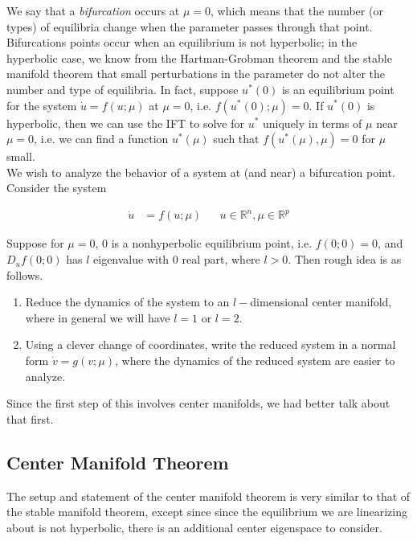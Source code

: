 \documentclass{article}
\def\R{{\mathbb R}}
\begin{document}
We say that a \emph{bifurcation} occurs at $\mu = 0$, which means that the number (or types) of equilibria change when the parameter passes through that point. Bifurcations points occur when an equilibrium is not hyperbolic; in the hyperbolic case, we know from the Hartman-Grobman theorem and the stable manifold theorem that small perturbations in the parameter do not alter the number and type of equilibria. In fact, suppose $u^*(0)$ is an equilibrium point for the system $\dot{u} = f(u; \mu)$ at $\mu = 0$, i.e. $f(u^*(0); \mu)= 0$. If $u^*(0)$ is hyperbolic, then we can use the IFT to solve for $u^*$ uniquely in terms of $\mu$ near $\mu = 0$, i.e. we can find a function $u^*(\mu)$ such that $f(u^*(\mu), \mu) = 0$ for $\mu$ small.\\

We wish to analyze the behavior of a system at (and near) a bifurcation point. \\

Consider the system

\begin{align}
\dot{u} &= f(u; \mu) && u \in \R^n, \mu \in \R^p
\end{align}

Suppose for $\mu = 0$, 0 is a nonhyperbolic equilibrium point, i.e. $f(0; 0) = 0$, and $D_u f(0; 0)$ has $l$ eigenvalue with 0 real part, where $l > 0$. Then rough idea is as follows.

\begin{enumerate}
\item Reduce the dynamics of the system to an $l-$dimensional center manifold, where in general we will have $l = 1$ or $l = 2$.
\item Using a clever change of coordinates, write the reduced system in a normal form $\dot{v} = g(v; \mu)$, where the dynamics of the reduced system are easier to analyze.
\end{enumerate}

Since the first step of this involves center manifolds, we had better talk about that first.

\subsection{Center Manifold Theorem}

The setup and statement of the center manifold theorem is very similar to that of the stable manifold theorem, except since since the equilibrium we are linearizing about is not hyperbolic, there is an additional center eigenspace to consider.
\end{document}
